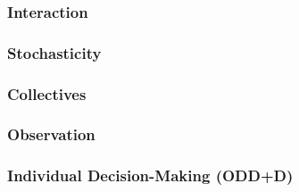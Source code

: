 \documentclass[
  man,
  10pt,
  a4paper,
  floatsintext
]{apa7}
\begin{document}
\begin{guidingbox}
\end{guidingbox}

\subsubsection{Interaction}

\begin{guidingbox}
\end{guidingbox}

\subsubsection{Stochasticity}

\begin{guidingbox}
\end{guidingbox}

\subsubsection{Collectives}

\begin{guidingbox}
\end{guidingbox}

\subsubsection{Observation}

\begin{guidingbox}
\end{guidingbox}

\subsubsection{Individual Decision-Making (ODD+D)}
\end{document}
